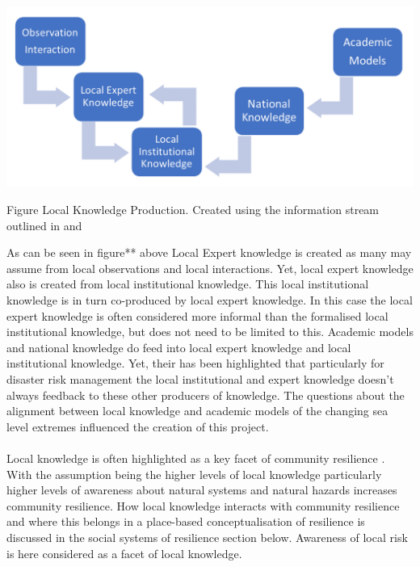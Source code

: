 \includegraphics[width=1\textwidth]{fig_theory/local knowledge accumulation.png}

\begin{frame}{Figure Local Knowledge Production. Created using the information stream outlined in \cite{setten_we_2019} and \cite{rod_integrated_2012}}
\end{frame}

As can be seen in figure** above Local Expert knowledge is created as many may assume from local observations and local interactions. Yet, local expert knowledge also is created from local institutional knowledge. This local institutional knowledge is in turn co-produced by local expert knowledge. In this case the local expert knowledge is often considered more informal than the formalised local institutional knowledge, but does not need to be limited to this.  Academic models and national knowledge do feed into local expert knowledge and local institutional knowledge. Yet, their has been highlighted that particularly for disaster risk management the local institutional and expert knowledge doesn't always feedback to these other producers of knowledge\cite{rod_integrated_2012}. The questions about the alignment between local knowledge and academic models of the changing sea level extremes influenced the creation of this project. 

\paragraph{}

Local knowledge is often highlighted as a key facet of community resilience \cite{setten_we_2019}. With the assumption being the higher levels of local knowledge particularly higher levels of awareness about natural systems and natural hazards increases community resilience.  How local knowledge interacts with community resilience and where this belongs in a place-based conceptualisation of resilience is discussed in the social systems of resilience section below. Awareness of local risk is here considered as a facet of local knowledge.  

